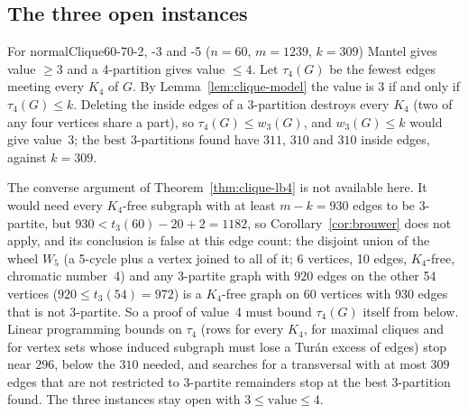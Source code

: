 \subsection{The three open instances}

For normalClique60-70-2, -3 and -5 ($n=60$, $m=1239$, $k=309$) Mantel gives
value $\ge 3$ and a 4-partition gives value $\le 4$. Let $\tau_4(G)$ be the
fewest edges meeting every $K_4$ of $G$. By Lemma~\ref{lem:clique-model} the
value is $3$ if and only if $\tau_4(G)\le k$. Deleting the inside edges of a
3-partition destroys every $K_4$ (two of any four vertices share a part), so
$\tau_4(G)\le w_3(G)$, and $w_3(G)\le k$ would give value~$3$; the best
3-partitions found have $311$, $310$ and $310$ inside edges, against $k=309$.

The converse argument of Theorem~\ref{thm:clique-lb4} is not available
here. It would need every $K_4$-free subgraph with at least $m-k=930$ edges
to be 3-partite, but $930<t_3(60)-20+2=1182$, so Corollary~\ref{cor:brouwer}
does not apply, and its conclusion is false at this edge count: the disjoint
union of the wheel $W_5$ (a 5-cycle plus a vertex joined to all of it; 6
vertices, 10 edges, $K_4$-free, chromatic number~4) and any 3-partite graph
with $920$ edges on the other 54 vertices ($920\le t_3(54)=972$) is a
$K_4$-free graph on 60 vertices with 930 edges that is not 3-partite. So a
proof of value~4 must bound $\tau_4(G)$ itself from below. Linear
programming bounds on $\tau_4$ (rows for every $K_4$, for maximal cliques and
for vertex sets whose induced subgraph must lose a Tur\'an excess of edges)
stop near $296$, below the $310$ needed, and searches for a transversal with
at most $309$ edges that are not restricted to 3-partite remainders stop at
the best 3-partition found. The three instances stay open with
$3\le\text{value}\le 4$.
